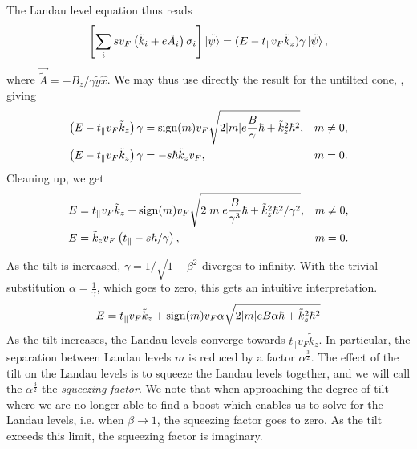 The Landau level equation thus reads
\begin{equation}
  \label{eq:54}
  \left[
  \sum\limits_{i} s v_{F} \left(\tilde{k}_{i} + e \tilde{A}_{i} \right) \sigma _{i}
\right  ] \ket{\tilde{\psi}} =
(E- t_{\parallel} v_{F} \tilde{k}_{z}) \gamma \ket{\tilde{\psi}},
\end{equation}
where \(\vec{\tilde{A}}=-B_{z}/ \gamma  \tilde{y} \hat{x}\).
We may thus use directly the result for the untilted cone, , giving
\begin{align}
  \label{eq:55}
  \left(E - t_{\parallel} v_{F} \tilde{k}_{z} \right) \gamma &= \operatorname{sign} (m) v_{F} \sqrt{2 |m| e \frac{B}{ \gamma } \hbar + \tilde{k}_{z}^2 \hbar ^2}, & m \neq 0,\\
  \left(E - t_{\parallel} v_{F} \tilde{k}_{z} \right) \gamma &= - s \hbar  \tilde{k}_{z} v_{F}, & m=0.
\end{align}
Cleaning up, we get
\begin{align}
  \label{eq:56}
  E &= t_{\parallel} v_F \tilde{k}_{z} + \operatorname{sign}(m) v_F \sqrt{2 |m| e \frac{B}{\gamma ^3} \hbar + \tilde{k}_{z}^2\hbar ^2 /\gamma ^2}, & m\neq 0,\\
  E &= \tilde{k}_{z} v_{F} \left( t_{\parallel}  - s \hbar / \gamma  \right), & m=0.
\end{align}

As the tilt is increased, \(\gamma = 1 / \sqrt{1-\beta ^{2}}\) diverges to infinity.
With the trivial substitution \(\alpha = \frac{1}{\gamma }\), which goes to zero, this gets an intuitive interpretation.
\begin{equation}
  \label{eq:57}
  E = t_{\parallel} v_{F} \tilde{k}_{z} + \operatorname{sign}(m) v_F \alpha \sqrt{2 |m| e B \alpha \hbar + \tilde{k}_{z}^2\hbar ^2}
\end{equation}
As the tilt increases, the Landau levels converge towards \(t_{\parallel} v_{F} \tilde{k}_{z}\).
In particular, the separation between Landau levels \(m\)  is reduced by a factor \(\alpha ^{\frac{3}{2}}\).
The effect of the tilt on the Landau levels is to squeeze the Landau levels together, and we will call the \(\alpha ^{\frac{3}{2}}\) the \emph{squeezing factor}.
We note that when approaching the degree of tilt where we are no longer able to find a boost which enables us to solve for the Landau levels, i.e. when \(\beta \to 1\), the squeezing factor goes to zero.
As the tilt exceeds this limit, the squeezing factor is imaginary.

